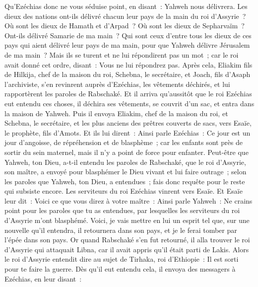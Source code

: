 \begin{multicols}{2}
Qu'Ezéchias donc ne vous séduise point, en disant~: Yahweh nous délivrera. Les dieux des nations ont-ils délivré chacun leur pays de la main du roi d'Assyrie~?
Où sont les dieux de Hamath et d'Arpad~? Où sont les dieux de Sepharvaïm~? Ont-ils délivré Samarie de ma main~?
Qui sont ceux d'entre tous les dieux de ces pays qui aient délivré leur pays de ma main, pour que Yahweh délivre Jérusalem de ma main~?
Mais ils se turent et ne lui répondirent pas un mot~; car le roi avait donné cet ordre, disant~: Vous ne lui répondrez pas.
Après cela, Eliakim fils de Hilkija, chef de la maison du roi, Schebna, le secrétaire, et Joach, fils d'Asaph l'archiviste, s'en revinrent auprès d'Ezéchias, les vêtements déchirés, et lui rapportèrent les paroles de Rabschaké.
\VerseOne{}Et il arriva qu'aussitôt que le roi Ezéchias eut entendu ces choses, il déchira ses vêtements, se couvrit d'un sac, et entra dans la maison de Yahweh.
Puis il envoya Eliakim, chef de la maison du roi, et Schebna, le secrétaire, et les plus anciens des prêtres couverts de sacs, vers Esaïe, le prophète, fils d'Amots.
Et ils lui dirent~: Ainsi parle Ezéchias~: Ce jour est un jour d'angoisse, de répréhension et de blasphème~; car les enfants sont près de sortir du sein maternel, mais il n'y a point de force pour enfanter.
Peut-être que Yahweh, ton Dieu, a-t-il entendu les paroles de Rabschaké, que le roi d'Assyrie, son maître, a envoyé pour blasphémer le Dieu vivant et lui faire outrage~; selon les paroles que Yahweh, ton Dieu, a entendues~; fais donc requête pour le reste qui subsiste encore.
Les serviteurs du roi Ezéchias vinrent vers Esaïe.
Et Esaïe leur dit~: Voici ce que vous direz à votre maître~: Ainsi parle Yahweh~: Ne crains point pour les paroles que tu as entendues, par lesquelles les serviteurs du roi d'Assyrie m'ont blasphémé.
Voici, je vais mettre en lui un esprit tel que, sur une nouvelle qu'il entendra, il retournera dans son pays, et je le ferai tomber par l'épée dans son pays.
Or quand Rabschaké s'en fut retourné, il alla trouver le roi d'Assyrie qui attaquait Libna, car il avait appris qu'il était parti de Lakis.
Alors le roi d'Assyrie entendit dire au sujet de Tirhaka, roi d'Ethiopie~: Il est sorti pour te faire la guerre. Dès qu'il eut entendu cela, il envoya des messagers à Ezéchias, en leur disant~:

\end{multicols}
